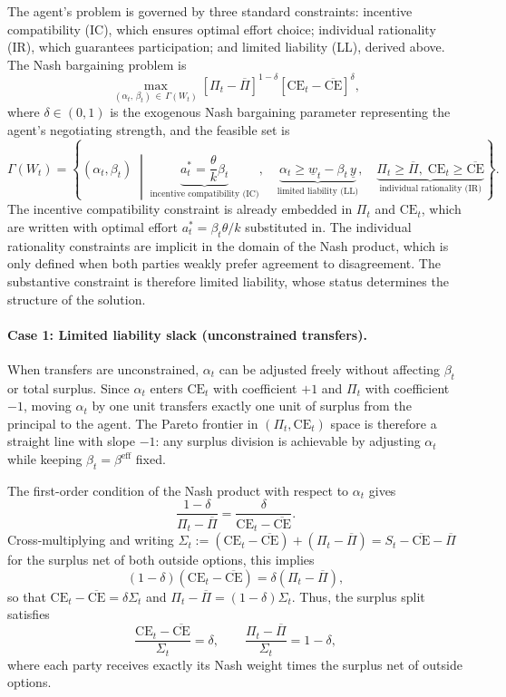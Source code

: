 \documentclass{article}
\theoremstyle{definition}
\theoremstyle{plain}
\begin{document}
The agent's problem is governed by three standard constraints: incentive compatibility (IC), which ensures optimal effort choice; individual rationality (IR), which guarantees participation; and limited liability (LL), derived above. The Nash bargaining problem is
\[
\max_{(\alpha_t,\,\beta_t)\,\in\,\Gamma(W_t)} [\Pi_t - \overline{\Pi}]^{1-\delta} [\text{CE}_t - \overline{\text{CE}}]^{\delta},
\]
where $\delta \in (0,1)$ is the exogenous Nash bargaining parameter representing the agent's negotiating strength, and the feasible set is
\[
\Gamma(W_t) = \left\{(\alpha_t,\beta_t)\;\middle|\;
\underbrace{a_t^* = \dfrac{\theta}{k}\beta_t}_{\text{incentive compatibility (IC)}},\quad
\underbrace{\alpha_t \geq \underline{w}_t - \beta_t\,\underline{y}}_{\text{limited liability (LL)}},\quad
\underbrace{\Pi_t \geq \overline{\Pi},\;\text{CE}_t \geq \overline{\text{CE}}}_{\text{individual rationality (IR)}}
\right\}.
\]
The incentive compatibility constraint is already embedded in $\Pi_t$ and $\text{CE}_t$, which are written with optimal effort $a_t^* = \beta_t\theta/k$ substituted in. The individual rationality constraints are implicit in the domain of the Nash product, which is only defined when both parties weakly prefer agreement to disagreement. The substantive constraint is therefore limited liability, whose status determines the structure of the solution.

\paragraph{Case 1: Limited liability slack (unconstrained transfers).}

When transfers are unconstrained, $\alpha_t$ can be adjusted freely without affecting $\beta_t$ or total surplus. Since $\alpha_t$ enters $\text{CE}_t$ with coefficient $+1$ and $\Pi_t$ with coefficient $-1$, moving $\alpha_t$ by one unit transfers exactly one unit of surplus from the principal to the agent. The Pareto frontier in $(\Pi_t, \text{CE}_t)$ space is therefore a straight line with slope $-1$: any surplus division is achievable by adjusting $\alpha_t$ while keeping $\beta_t = \beta^{\text{eff}}$ fixed.

The first-order condition of the Nash product with respect to $\alpha_t$ gives
\[
\frac{1-\delta}{\Pi_t - \overline{\Pi}} = \frac{\delta}{\text{CE}_t - \overline{\text{CE}}}.
\]
Cross-multiplying and writing $\Sigma_t := (\text{CE}_t - \overline{\text{CE}}) + (\Pi_t - \overline{\Pi}) = S_t - \overline{\text{CE}} - \overline{\Pi}$ for the surplus net of both outside options, this implies
\[
(1-\delta)(\text{CE}_t - \overline{\text{CE}}) = \delta(\Pi_t - \overline{\Pi}),
\]
so that $\text{CE}_t - \overline{\text{CE}} = \delta \Sigma_t$ and $\Pi_t - \overline{\Pi} = (1-\delta)\Sigma_t$. Thus, the surplus split satisfies
\[
\frac{\text{CE}_t - \overline{\text{CE}}}{\Sigma_t} = \delta, \qquad \frac{\Pi_t - \overline{\Pi}}{\Sigma_t} = 1 - \delta,
\]
where each party receives exactly its Nash weight times the surplus net of outside options.
\end{document}

